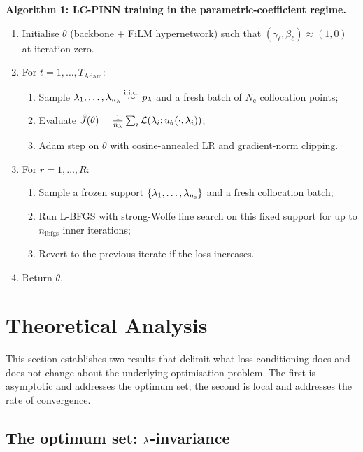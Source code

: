 \documentclass[12pt,a4paper]{extarticle}
\begin{document}
\noindent\textbf{Algorithm 1: LC-PINN training in the parametric-coefficient regime.}
\begin{enumerate}
    \item Initialise $\theta$ (backbone + FiLM hypernetwork) such that $(\gamma_\ell, \beta_\ell) \approx (1, 0)$ at iteration zero.
    \item For $t = 1, \ldots, T_{\mathrm{Adam}}$:
    \begin{enumerate}
        \item Sample $\lambda_1, \ldots, \lambda_{n_\lambda} \overset{\mathrm{i.i.d.}}{\sim} p_\lambda$ and a fresh batch of $N_{\mathrm{c}}$ collocation points;
        \item Evaluate $\hat J(\theta) = \frac{1}{n_\lambda} \sum_i \mathcal{L}(\lambda_i; u_\theta(\cdot, \lambda_i))$;
        \item Adam step on $\theta$ with cosine-annealed LR and gradient-norm clipping.
    \end{enumerate}
    \item For $r = 1, \ldots, R$:
    \begin{enumerate}
        \item Sample a frozen support $\{\lambda_1, \ldots, \lambda_{n_{\mathrm{s}}}\}$ and a fresh collocation batch;
        \item Run L-BFGS with strong-Wolfe line search on this fixed support for up to $n_{\mathrm{lbfgs}}$ inner iterations;
        \item Revert to the previous iterate if the loss increases.
    \end{enumerate}
    \item Return $\theta$.
\end{enumerate}

\newpage

\section{Theoretical Analysis}
\label{sec:theory}

This section establishes two results that delimit what loss-conditioning does and does not change about the underlying optimisation problem. The first is asymptotic and addresses the optimum set; the second is local and addresses the rate of convergence.

\subsection{The optimum set: \texorpdfstring{$\lambda$}{lambda}-invariance}
\end{document}
